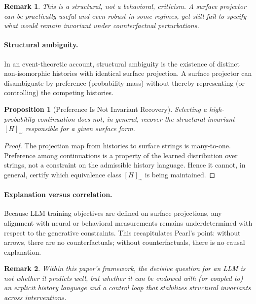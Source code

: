 \documentclass[11pt]{article}
\newtheorem{remark}{Remark}
\newtheorem{proposition}{Proposition}
\begin{document}
\begin{remark}
This is a structural, not a behavioral, criticism. A surface projector can be practically useful and even robust in some regimes, yet still fail to specify what would remain invariant under counterfactual perturbations.
\end{remark}

\paragraph{Structural ambiguity.}
In an event-theoretic account, structural ambiguity is the existence of distinct non-isomorphic histories with identical surface projection. A surface projector can disambiguate by preference (probability mass) without thereby representing (or controlling) the competing histories.

\begin{proposition}[Preference Is Not Invariant Recovery]
Selecting a high-probability continuation does not, in general, recover the structural invariant $[H]_{\sim}$ responsible for a given surface form.
\end{proposition}

\begin{proof}
The projection map from histories to surface strings is many-to-one. Preference among continuations is a property of the learned distribution over strings, not a constraint on the admissible history language. Hence it cannot, in general, certify which equivalence class $[H]_{\sim}$ is being maintained.
\end{proof}

\paragraph{Explanation versus correlation.}
Because LLM training objectives are defined on surface projections, any alignment with neural or behavioral measurements remains underdetermined with respect to the generative constraints. This recapitulates Pearl’s point: without arrows, there are no counterfactuals; without counterfactuals, there is no causal explanation.

\begin{remark}
Within this paper’s framework, the decisive question for an LLM is not whether it predicts well, but whether it can be endowed with (or coupled to) an explicit history language and a control loop that stabilizes structural invariants across interventions.
\end{remark}
\end{document}
